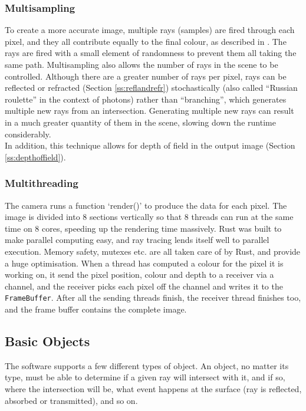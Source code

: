 \documentclass[a4paper]{article}
\begin{document}
\subsubsection{Multisampling} To create a more accurate image, multiple rays (samples) are fired through each pixel, and they all contribute equally to the final colour, as described in \cite{Cook1984multisampling}. The rays are fired with a small element of randomness to prevent them all taking the same path. Multisampling also allows the number of rays in the scene to be controlled. Although there are a greater number of rays per pixel, rays can be reflected or refracted (Section \ref{ss:reflandrefr}) stochastically (also called ``Russian roulette'' in the context of photons) rather than ``branching'', which generates multiple new rays from an intersection. Generating multiple new rays can result in a much greater quantity of them in the scene, slowing down the runtime considerably.\\

In addition, this technique allows for depth of field in the output image (Section \ref{ss:depthoffield}).\\

\subsubsection{Multithreading}
The camera runs a function `render()' to produce the data for each pixel. The image is divided into 8 sections vertically so that 8 threads can run at the same time on 8 cores, speeding up the rendering time massively. Rust was built to make parallel computing easy, and ray tracing lends itself well to parallel execution. Memory safety, mutexes etc. are all taken care of by Rust, and provide a huge optimisation. When a thread has computed a colour for the pixel it is working on, it send the pixel position, colour and depth to a receiver via a channel, and the receiver picks each pixel off the channel and writes it to the \texttt{FrameBuffer}. After all the sending threads finish, the receiver thread finishes too, and the frame buffer contains the complete image.

\subsection{Basic Objects}
The software supports a few different types of object. An object, no matter its type, must be able to determine if a given ray will intersect with it, and if so, where the intersection will be, what event happens at the surface (ray is reflected, absorbed or transmitted), and so on.
\end{document}
